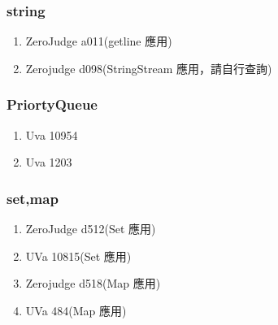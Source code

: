 \subsubsection{string}
\begin{enumerate}
\item ZeroJudge a011(getline 應用)
\item Zerojudge d098(StringStream 應用，請自行查詢)
\end{enumerate}
\subsubsection{PriortyQueue}
\begin{enumerate}
\item Uva 10954
\item Uva 1203
\end{enumerate}
\subsubsection{set,map}
\begin{enumerate}
\item ZeroJudge d512(Set 應用)
\item UVa 10815(Set 應用)
\item Zerojudge d518(Map 應用)
\item UVa 484(Map 應用)
\end{enumerate}









